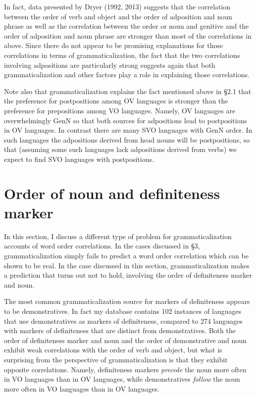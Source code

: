 \documentclass[output=paper]{langsci/langscibook}
\begin{document}
In fact, data presented by Dryer (1992, 2013) suggests that the correlation between the order of verb and object and the order of adposition and noun phrase as well as the correlation between the order or noun and genitive and the order of adposition and noun phrase are stronger than most of the correlations in  above. Since there do not appear to be promising explanations for those correlations in terms of grammaticalization, the fact that the two correlations involving adpositions are particularly strong suggests again that both grammaticalization and other factors play a role in explaining those correlations.

Note also that grammaticalization explains the fact mentioned above in §2.1 that the preference for postpositions among OV languages is stronger than the preference for prepositions among VO languages. Namely, OV languages are overwhelmingly GenN so that both sources for adpositions lead to postpositions in OV languages. In contrast there are many SVO languages with GenN order. In such languages the adpositions derived from head nouns will be postpositions, so that (assuming some such languages lack adpositions derived from verbs) we expect to find SVO languages with postpositions.

\section{Order of noun and definiteness marker}

In this section, I discuss a different type of problem for grammaticalization accounts of word order correlations. In the cases discussed in §3, grammaticalization simply fails to predict a word order correlation which can be shown to be real. In the case discussed in this section, grammaticalization makes a prediction that turns out not to hold, involving the order of definiteness marker and noun.

The most common grammaticalization source for markers of definiteness appears to be demonstratives. In fact my database contains 102 instances of languages that use demonstratives as markers of definiteness, compared to 274 languages with markers of definiteness that are distinct from demonstratives. Both the order of definiteness marker and noun and the order of demonstrative and noun exhibit weak correlations with the order of verb and object, but what is surprising from the perspective of grammaticalization is that they exhibit opposite correlations. Namely, definiteness markers \textit{precede} the noun more often in VO languages than in OV languages, while demonstratives \textit{follow} the noun more often in VO languages than in OV languages.
\end{document}
